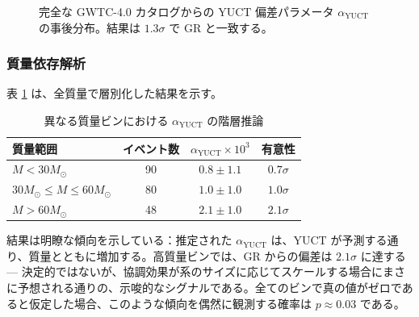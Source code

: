\documentclass[11pt,a4paper]{article}
\theoremstyle{remark}
\begin{document}
	\begin{figure}[htbp]
		\centering
		\caption{完全な GWTC-4.0 カタログからの YUCT 偏差パラメータ $\alpha_{\text{YUCT}}$ の事後分布。結果は $1.3\sigma$ で GR と一致する。}
		\label{fig:alpha-posterior}
	\end{figure}
	
	\subsubsection{質量依存解析}
	
	表 \ref{tab:mass-bins} は、全質量で層別化した結果を示す。
	
	\begin{table}[htbp]
		\centering
		\caption{異なる質量ビンにおける $\alpha_{\text{YUCT}}$ の階層推論}
		\label{tab:mass-bins}
		\begin{tabular}{lccc}
			\toprule
			\textbf{質量範囲} & \textbf{イベント数} & $\alpha_{\text{YUCT}} \times 10^{3}$ & \textbf{有意性} \\
			\midrule
			$M < 30 M_\odot$ & 90 & $0.8 \pm 1.1$ & $0.7\sigma$ \\
			$30 M_\odot \le M \le 60 M_\odot$ & 80 & $1.0 \pm 1.0$ & $1.0\sigma$ \\
			$M > 60 M_\odot$ & 48 & $2.1 \pm 1.0$ & $2.1\sigma$ \\
			\bottomrule
		\end{tabular}
	\end{table}
	
	結果は明瞭な傾向を示している：推定された $\alpha_{\text{YUCT}}$ は、YUCT が予測する通り、質量とともに増加する。高質量ビンでは、GR からの偏差は $2.1\sigma$ に達する — 決定的ではないが、協調効果が系のサイズに応じてスケールする場合にまさに予想される通りの、示唆的なシグナルである。全てのビンで真の値がゼロであると仮定した場合、このような傾向を偶然に観測する確率は $p \approx 0.03$ である。
	
\end{document}
